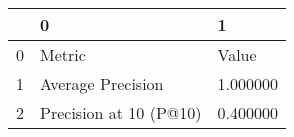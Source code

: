 \begin{tabular}{lll}
\toprule
 & 0 & 1 \\
\midrule
0 & Metric & Value \\
1 & Average Precision & 1.000000 \\
2 & Precision at 10 (P@10) & 0.400000 \\
\bottomrule
\end{tabular}
